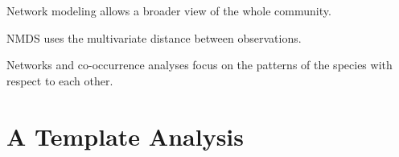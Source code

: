 \documentclass[12pt]{article}
\begin{document}

Network modeling allows a broader view of the whole community. 

NMDS uses the multivariate distance between observations. 


Networks and co-occurrence analyses focus on the patterns of the
species with respect to each other.


\section{A Template Analysis}

\end{document}
